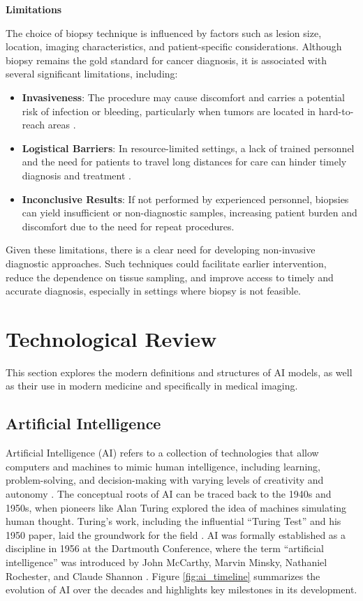 \documentclass[a4paper,10pt]{book}
\begin{document}
\textbf{Limitations}

The choice of biopsy technique is influenced by factors such as lesion size, location, imaging characteristics, and patient-specific considerations. Although biopsy remains the gold standard for cancer diagnosis, it is associated with several significant limitations, including:

\begin{itemize}
    \item \textbf{Invasiveness}: The procedure may cause discomfort and carries a potential risk of infection or bleeding, particularly when tumors are located in hard-to-reach areas \cite{amino_pros_2024}.
    \item \textbf{Logistical Barriers}: In resource-limited settings, a lack of trained personnel and the need for patients to travel long distances for care can hinder timely diagnosis and treatment \cite{silva_breast_2023}.
    \item \textbf{Inconclusive Results}: If not performed by experienced personnel, biopsies can yield insufficient or non-diagnostic samples, increasing patient burden and discomfort due to the need for repeat procedures.
\end{itemize}

Given these limitations, there is a clear need for developing non-invasive diagnostic approaches. Such techniques could facilitate earlier intervention, reduce the dependence on tissue sampling, and improve access to timely and accurate diagnosis, especially in settings where biopsy is not feasible.


\chapter{Technological Review}

This section explores the modern definitions and structures of AI models, as well as their use in modern medicine and specifically in medical imaging.

\section{Artificial Intelligence}

Artificial Intelligence (AI) refers to a collection of technologies that allow computers and machines to mimic human intelligence, including learning, problem-solving, and decision-making with varying levels of creativity and autonomy \cite{colestrykerWhatArtificialIntelligence2024}. The conceptual roots of AI can be traced back to the 1940s and 1950s, when pioneers like Alan Turing explored the idea of machines simulating human thought. Turing’s work, including the influential “Turing Test” and his 1950 paper, laid the groundwork for the field \cite{turing_icomputing_1950}. AI was formally established as a discipline in 1956 at the Dartmouth Conference, where the term “artificial intelligence” was introduced by John McCarthy, Marvin Minsky, Nathaniel Rochester, and Claude Shannon \cite{filipsson_evolution_2024}. Figure \ref{fig:ai_timeline} summarizes the evolution of AI over the decades and highlights key milestones in its development.
\end{document}
